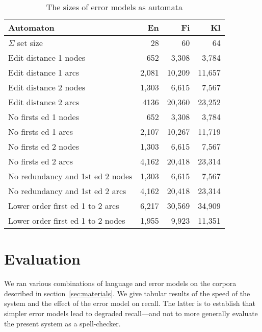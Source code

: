 \documentclass[11pt]{article}
\begin{document}
\begin{table}[h]
\begin{center}
\begin{scriptsize}
\begin{tabular}{|l|rrr|}
\hline
\bf Automaton & \bf En & \bf Fi & \bf Kl  \\ 
\hline
$\Sigma$ set size &
 28& 60& 64
\\
Edit distance 1 nodes &
 652& 3,308& 3,784
\\
Edit distance 1 arcs &
 2,081& 10,209& 11,657
\\
Edit distance 2 nodes &
 1,303& 6,615& 7,567
\\
Edit distance 2 arcs &
 4136& 20,360& 23,252
\\
No firsts ed 1 nodes & 
 652& 3,308& 3,784
\\
No firsts ed 1 arcs & 
 2,107& 10,267& 11,719
\\
No firsts ed 2 nodes &
 1,303& 6,615& 7,567
\\
No firsts ed 2 arcs &
 4,162& 20,418& 23,314
\\
No redundancy and 1st ed 2 nodes &
 1,303& 6,615& 7,567
\\
No redundancy and 1st ed 2 arcs &
 4,162& 20,418& 23,314
\\
Lower order first ed 1 to 2 arcs &
6,217 & 30,569 & 34,909
\\
Lower order first ed 1 to 2 nodes &
1,955 & 9,923 & 11,351
\\
\hline
\end{tabular}
\end{scriptsize}
\end{center}
\caption{\label{table:error-sizes}
The sizes of error models as automata}
\end{table}


\section{Evaluation}
\label{sec:evaluation}

We ran various combinations of language and error
models on the corpora described in section~\ref{sec:materials}. We give
tabular results of the speed of the system and the effect of the error model
on recall. The latter is to establish that simpler error models lead
to degraded recall---and not to more generally evaluate the present system
as a spell-checker.
\end{document}

